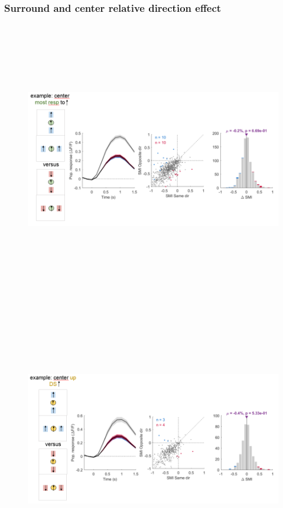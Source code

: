 \subsubsection{Surround and center relative direction effect}

\begin{figure}[H] \centering \includegraphics[width=12cm,height=12cm,keepaspectratio]{Figures/7.Results/finalPopulation/sel/diagrams/17.png} 
\end{figure}

\begin{figure}[H] \centering \includegraphics[width=12cm,height=12cm,keepaspectratio]{Figures/7.Results/finalPopulation/sel/diagrams/18.png} 
\end{figure}

